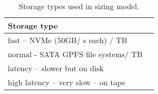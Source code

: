 \tiny \begin{longtable} { |p{}  |r |} 
\caption{Storage types used in sizing model. \label{tab:idfstorage}}\\ 
\hline 
\textbf{Storage type } \\ \hline
{fast -- NVMe (50GB/ s each) / TB  } \\ \hline
{normal - SATA GPFS file systems/ TB  } \\ \hline
{latency -- slower but on disk } \\ \hline
{high latency -- very slow -- on tape } \\ \hline
\end{longtable} \normalsize
